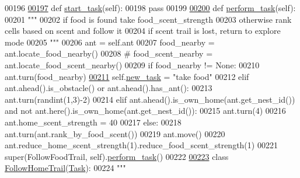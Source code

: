 \begin{DoxyCode}
00196 
\hypertarget{task__manager_8py_source_l00197}{}\hyperlink{classtask__manager_1_1FollowFoodTrail_a68013dbb3ab9d25676217de4d22c48eb}{00197}     \textcolor{keyword}{def }\hyperlink{classtask__manager_1_1FollowFoodTrail_a68013dbb3ab9d25676217de4d22c48eb}{start\_task}(self):
00198         \textcolor{keywordflow}{pass}
00199 
\hypertarget{task__manager_8py_source_l00200}{}\hyperlink{classtask__manager_1_1FollowFoodTrail_aa805a2a4e9a76ba7afa252ca5efbd121}{00200}     \textcolor{keyword}{def }\hyperlink{classtask__manager_1_1FollowFoodTrail_aa805a2a4e9a76ba7afa252ca5efbd121}{perform\_task}(self):
00201         \textcolor{stringliteral}{"""}
00202 \textcolor{stringliteral}{        if food is found take food\_scent\_strength}
00203 \textcolor{stringliteral}{        otherwise rank cells based on scent and follow it}
00204 \textcolor{stringliteral}{        if scent trail is lost, return to explore mode}
00205 \textcolor{stringliteral}{        """}
00206         ant = self.ant
00207         food\_nearby = ant.locate\_food\_nearby()
00208         \textcolor{comment}{# food\_scent\_nearby = ant.locate\_food\_scent\_nearby()}
00209         \textcolor{keywordflow}{if} food\_nearby != \textcolor{keywordtype}{None}:
00210             ant.turn(food\_nearby)
\hypertarget{task__manager_8py_source_l00211}{}\hyperlink{classtask__manager_1_1FollowFoodTrail_aefc8c49492622a4e4fa61279fd52ed12}{00211}             self.\hyperlink{classtask__manager_1_1Task_af16658f4c3c447e24f73ed3d1803e058}{new\_task} = \textcolor{stringliteral}{"take food"}
00212         \textcolor{keywordflow}{elif} ant.ahead().is\_obstacle() \textcolor{keywordflow}{or} ant.ahead().has\_ant():
00213             ant.turn(randint(1,3)-2)
00214         \textcolor{keywordflow}{elif} ant.ahead().is\_own\_home(ant.get\_nest\_id()) \textcolor{keywordflow}{and} \textcolor{keywordflow}{not} ant.here().is\_own\_home(ant.get\_nest\_id()):
00215             ant.turn(4)
00216             ant.home\_scent\_strength = 40
00217         \textcolor{keywordflow}{else}:
00218             ant.turn(ant.rank\_by\_food\_scent())
00219             ant.move()
00220         ant.reduce\_home\_scent\_strength(1).reduce\_food\_scent\_strength(1)
00221         super(FollowFoodTrail, self).\hyperlink{classtask__manager_1_1FollowFoodTrail_aa805a2a4e9a76ba7afa252ca5efbd121}{perform\_task}()
00222 
\hypertarget{task__manager_8py_source_l00223}{}\hyperlink{classtask__manager_1_1FollowHomeTrail}{00223} \textcolor{keyword}{class }\hyperlink{classtask__manager_1_1FollowHomeTrail}{FollowHomeTrail}(\hyperlink{classtask__manager_1_1Task}{Task}):
00224     \textcolor{stringliteral}{"""}

\end{DoxyCode}
